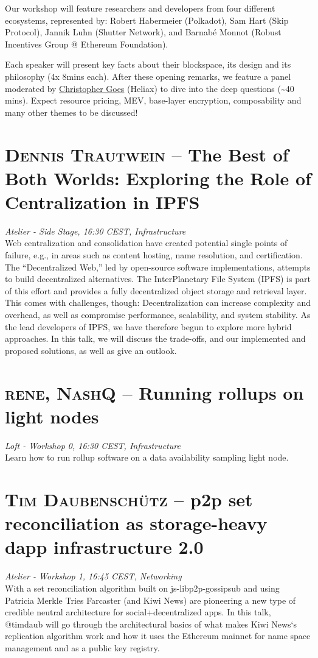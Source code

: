 Our workshop will feature researchers and developers from four different ecosystems, represented by:
Robert Habermeier (Polkadot),
Sam Hart (Skip Protocol),
Jannik Luhn (Shutter Network), and
Barnabé Monnot (Robust Incentives Group @ Ethereum Foundation).

Each speaker will present key facts about their blockspace, its design and its philosophy (4x 8mins each). After these opening remarks, we feature a panel moderated by \href{https://twitter.com/cwgoes}{Christopher Goes}
 (Heliax) to dive into the deep questions (\textasciitilde40
 mins). Expect resource pricing, MEV, base-layer encryption, composability and many other themes to be discussed!
\clearpage
\section {\textsc{Dennis Trautwein} -- The Best of Both Worlds: Exploring the Role of Centralization in IPFS
} \noindent \textit {Atelier - Side Stage, 16:30 CEST, Infrastructure
}\\[1em] Web centralization and consolidation have created potential single points of failure, e.g., in areas such as content hosting, name resolution, and certification. The ``Decentralized Web,'' led by open-source software implementations, attempts to build decentralized alternatives. The InterPlanetary File System (IPFS) is part of this effort and provides a fully decentralized object storage and retrieval layer. This comes with challenges, though: Decentralization can increase complexity and overhead, as well as compromise performance, scalability, and system stability. As the lead developers of IPFS, we have therefore begun to explore more hybrid approaches. In this talk, we will discuss the trade-offs, and our implemented and proposed solutions, as well as give an outlook.
\par \clearpage
\section {\textsc{rene, NashQ} -- Running rollups on light nodes
} \noindent \textit {Loft - Workshop 0, 16:30 CEST, Infrastructure
}\\[1em] Learn how to run rollup software on a data availability sampling light node.
\par \clearpage
\section {\textsc{Tim Daubenschütz} -- p2p set reconciliation as storage-heavy dapp infrastructure 2.0
} \noindent \textit {Atelier - Workshop 1, 16:45 CEST, Networking
}\\[1em] With a set reconciliation algorithm built on js-libp2p-gossipsub and using Patricia Merkle Tries Farcaster (and Kiwi News) are pioneering a new type of credible neutral architecture for social+decentralized apps. In this talk, @timdaub will go through the architectural basics of what makes Kiwi News`s replication algorithm work and how it uses the Ethereum mainnet for name space management and as a public key registry.
\par \clearpage
